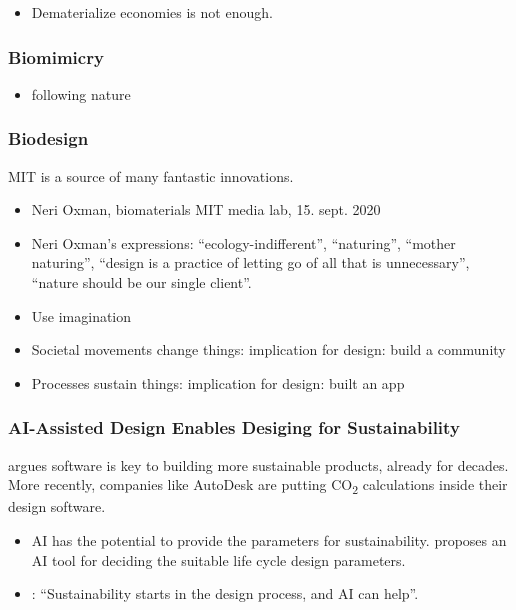 \documentclass[
  letterpaper,
  DIV=11,
  numbers=noendperiod]{scrartcl}
\providecommand{\tightlist}{%
  \setlength{\itemsep}{0pt}\setlength{\parskip}{0pt}}\usepackage{longtable,booktabs,array}
\begin{document}
\begin{itemize}
\tightlist
\item
  Dematerialize economies is not enough.
\end{itemize}

\subsubsection{Biomimicry}\label{biomimicry}

\begin{itemize}
\tightlist
\item
  following nature
\end{itemize}

\subsubsection{Biodesign}\label{biodesign}

MIT is a source of many fantastic innovations.

\begin{itemize}
\item
  Neri Oxman, biomaterials MIT media lab, 15. sept. 2020
\item
  Neri Oxman's expressions: ``ecology-indifferent'', ``naturing'',
  ``mother naturing'', ``design is a practice of letting go of all that
  is unnecessary'', ``nature should be our single client''.
\item
  Use imagination
\item
  Societal movements change things: implication for design: build a
  community
\item
  Processes sustain things: implication for design: built an app
\end{itemize}

\subsubsection{AI-Assisted Design Enables Desiging for
Sustainability}\label{ai-assisted-design-enables-desiging-for-sustainability}

\citet{guptaAnalysisArtificialIntelligencebased2023} argues software is
key to building more sustainable products, already for decades. More
recently, companies like AutoDesk are putting CO\textsubscript{2}
calculations inside their design software.

\begin{itemize}
\tightlist
\item
  AI has the potential to provide the parameters for sustainability.
  \citet{singhArtificialNeuralNetwork2023} proposes an AI tool for
  deciding the suitable life cycle design parameters.
\item
  \citet{SustainabilityStartsDesign}: ``Sustainability starts in the
  design process, and AI can help''.
\end{itemize}
\end{document}
